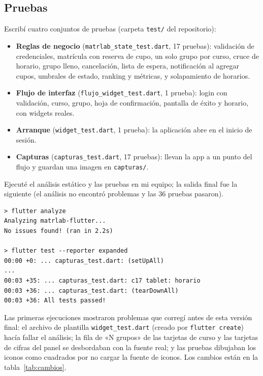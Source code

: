 \subsection{Pruebas}
\label{sec:pruebas}
Escribí cuatro conjuntos de pruebas (carpeta \texttt{test/} del repositorio):
\begin{itemize}
	\item \textbf{Reglas de negocio} (\texttt{matrlab\_state\_test.dart}, 17 pruebas): validación de credenciales, matrícula con reserva de cupo, un solo grupo por curso, cruce de horario, grupo lleno, cancelación, lista de espera, notificación al agregar cupos, umbrales de estado, ranking y métricas, y solapamiento de horarios.
	\item \textbf{Flujo de interfaz} (\texttt{flujo\_widget\_test.dart}, 1 prueba): login con validación, curso, grupo, hoja de confirmación, pantalla de éxito y horario, con widgets reales.
	\item \textbf{Arranque} (\texttt{widget\_test.dart}, 1 prueba): la aplicación abre en el inicio de sesión.
	\item \textbf{Capturas} (\texttt{capturas\_test.dart}, 17 pruebas): llevan la app a un punto del flujo y guardan una imagen en \texttt{capturas/}.
\end{itemize}

Ejecuté el análisis estático y las pruebas en mi equipo; la salida final fue la siguiente (el análisis no encontró problemas y las 36 pruebas pasaron).

\begin{lstlisting}[style=consola,numbers=none,caption={Resultado de \texttt{flutter analyze} y \texttt{flutter test} (25/10/2026).}]
> flutter analyze
Analyzing matrlab-flutter...
No issues found! (ran in 2.2s)

> flutter test --reporter expanded
00:00 +0: ... capturas_test.dart: (setUpAll)
...
00:03 +35: ... capturas_test.dart: c17 tablet: horario
00:03 +36: ... capturas_test.dart: (tearDownAll)
00:03 +36: All tests passed!
\end{lstlisting}

Las primeras ejecuciones mostraron problemas que corregí antes de esta versión final: el archivo de plantilla \texttt{widget\_test.dart} (creado por \texttt{flutter create}) hacía fallar el análisis; la fila de «N grupos» de las tarjetas de curso y las tarjetas de cifras del panel se desbordaban con la fuente real; y las pruebas dibujaban los iconos como cuadrados por no cargar la fuente de iconos. Los cambios están en la tabla~\ref{tab:cambios}.


